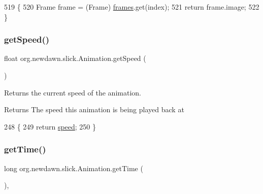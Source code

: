 \begin{DoxyCode}
519                                      \{
520         Frame frame = (Frame) \mbox{\hyperlink{classorg_1_1newdawn_1_1slick_1_1_animation_a39f0c6a16e479985b22f7dd3bb781bf7}{frames}}.get(index);
521         \textcolor{keywordflow}{return} frame.image;
522     \}
\end{DoxyCode}
\mbox{\label{classorg_1_1newdawn_1_1slick_1_1_animation_ab73965713275ddde16a5c1b30e9d257b}} 
\subsubsection{\texorpdfstring{get\+Speed()}{getSpeed()}}
{\footnotesize\ttfamily float org.\+newdawn.\+slick.\+Animation.\+get\+Speed (\begin{DoxyParamCaption}{ }\end{DoxyParamCaption})\hspace{0.3cm}{\ttfamily [inline]}}

Returns the current speed of the animation.

\begin{DoxyReturn}{Returns}
The speed this animation is being played back at 
\end{DoxyReturn}

\begin{DoxyCode}
248                             \{
249        \textcolor{keywordflow}{return} \mbox{\hyperlink{classorg_1_1newdawn_1_1slick_1_1_animation_a0ccda8ed8082763a52d2819e414dd5b9}{speed}};
250     \}
\end{DoxyCode}
\mbox{\label{classorg_1_1newdawn_1_1slick_1_1_animation_ad5d5822b4aa1ac0ed36fdb06d8c3a9c5}} 
\subsubsection{\texorpdfstring{get\+Time()}{getTime()}}
{\footnotesize\ttfamily long org.\+newdawn.\+slick.\+Animation.\+get\+Time (\begin{DoxyParamCaption}{ }\end{DoxyParamCaption})\hspace{0.3cm}{\ttfamily [inline]}, {\ttfamily [private]}}

